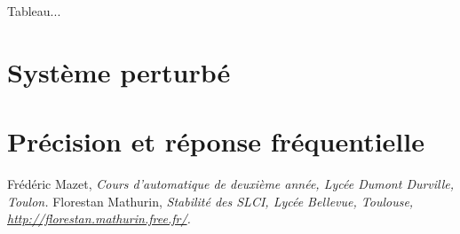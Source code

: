 \documentclass[10pt,fleqn]{article} %
\begin{document}
%

\begin{methode}

\end{methode}

\begin{resultat}
Tableau...
\end{resultat}

\section{Système perturbé}

\section{Précision et réponse fréquentielle}


\begin{thebibliography}{2}
    Frédéric Mazet, {\it Cours d'automatique de deuxième année, Lycée Dumont Durville, Toulon.}
       Florestan Mathurin, {\it Stabilité des SLCI, Lycée Bellevue, Toulouse, \url{http://florestan.mathurin.free.fr/}.}



\end{thebibliography}
\end{document}
